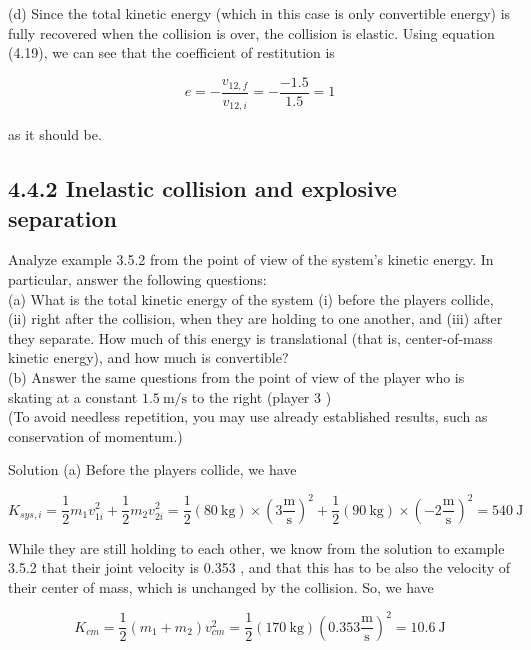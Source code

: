 \documentclass[10pt]{article}
\begin{document}
(d) Since the total kinetic energy (which in this case is only convertible energy) is fully recovered when the collision is over, the collision is elastic. Using equation (4.19), we can see that the coefficient of restitution is

$$
e=-\frac{v_{12, f}}{v_{12, i}}=-\frac{-1.5}{1.5}=1
$$

as it should be.

\subsection*{4.4.2 Inelastic collision and explosive separation}
Analyze example 3.5.2 from the point of view of the system's kinetic energy. In particular, answer the following questions:\\
(a) What is the total kinetic energy of the system (i) before the players collide, (ii) right after the collision, when they are holding to one another, and (iii) after they separate. How much of this energy is translational (that is, center-of-mass kinetic energy), and how much is convertible?\\
(b) Answer the same questions from the point of view of the player who is skating at a constant $1.5 \mathrm{~m} / \mathrm{s}$ to the right (player 3 )\\
(To avoid needless repetition, you may use already established results, such as conservation of momentum.)

Solution (a) Before the players collide, we have


\begin{equation*}
K_{s y s, i}=\frac{1}{2} m_{1} v_{1 i}^{2}+\frac{1}{2} m_{2} v_{2 i}^{2}=\frac{1}{2}(80 \mathrm{~kg}) \times\left(3 \frac{\mathrm{m}}{\mathrm{s}}\right)^{2}+\frac{1}{2}(90 \mathrm{~kg}) \times\left(-2 \frac{\mathrm{m}}{\mathrm{s}}\right)^{2}=540 \mathrm{~J} \tag{4.20}
\end{equation*}


While they are still holding to each other, we know from the solution to example 3.5.2 that their joint velocity is 0.353 , and that this has to be also the velocity of their center of mass, which is unchanged by the collision. So, we have


\begin{equation*}
K_{c m}=\frac{1}{2}\left(m_{1}+m_{2}\right) v_{c m}^{2}=\frac{1}{2}(170 \mathrm{~kg})\left(0.353 \frac{\mathrm{m}}{\mathrm{s}}\right)^{2}=10.6 \mathrm{~J} \tag{4.21}
\end{equation*}
\end{document}
